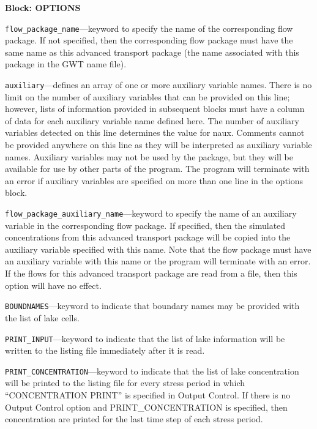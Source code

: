 
\item \textbf{Block: OPTIONS}

\begin{description}
\item \texttt{flow\_package\_name}---keyword to specify the name of the corresponding flow package.  If not specified, then the corresponding flow package must have the same name as this advanced transport package (the name associated with this package in the GWT name file).

\item \texttt{auxiliary}---defines an array of one or more auxiliary variable names.  There is no limit on the number of auxiliary variables that can be provided on this line; however, lists of information provided in subsequent blocks must have a column of data for each auxiliary variable name defined here.   The number of auxiliary variables detected on this line determines the value for naux.  Comments cannot be provided anywhere on this line as they will be interpreted as auxiliary variable names.  Auxiliary variables may not be used by the package, but they will be available for use by other parts of the program.  The program will terminate with an error if auxiliary variables are specified on more than one line in the options block.

\item \texttt{flow\_package\_auxiliary\_name}---keyword to specify the name of an auxiliary variable in the corresponding flow package.  If specified, then the simulated concentrations from this advanced transport package will be copied into the auxiliary variable specified with this name.  Note that the flow package must have an auxiliary variable with this name or the program will terminate with an error.  If the flows for this advanced transport package are read from a file, then this option will have no effect.

\item \texttt{BOUNDNAMES}---keyword to indicate that boundary names may be provided with the list of lake cells.

\item \texttt{PRINT\_INPUT}---keyword to indicate that the list of lake information will be written to the listing file immediately after it is read.

\item \texttt{PRINT\_CONCENTRATION}---keyword to indicate that the list of lake concentration will be printed to the listing file for every stress period in which ``CONCENTRATION PRINT'' is specified in Output Control.  If there is no Output Control option and PRINT\_CONCENTRATION is specified, then concentration are printed for the last time step of each stress period.


\end{description}
